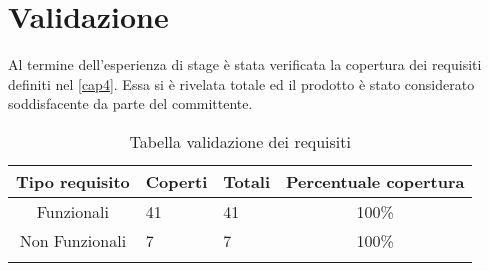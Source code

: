 \section{Validazione}
Al termine dell'esperienza di stage è stata verificata la copertura dei requisiti definiti nel \autoref{cap4}.
Essa si è rivelata totale ed il prodotto è stato considerato soddisfacente da parte del committente.

\begin{longtable}{cp{3cm}p{3cm}c}
\hline
\hline
\textbf{Tipo requisito} & \textbf{Coperti} &  \textbf{Totali} & \textbf{Percentuale copertura}\\
\hline
Funzionali & 41 & 41 & 100\% \\
\hline
Non Funzionali & 7 & 7 & 100\% \\

\hline
\hline
\caption{Tabella validazione dei requisiti}
\end{longtable}












